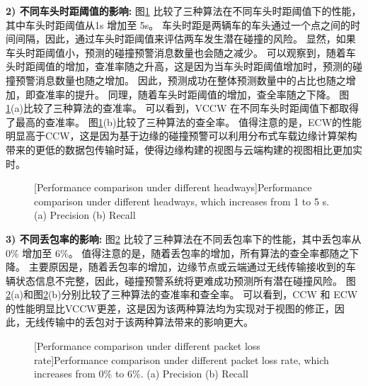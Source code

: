 \textbf{2) 不同车头时距阈值的影响:}
图\ref{fig 6-6} 比较了三种算法在不同车头时距阈值下的性能，其中车头时距阈值从1s 增加至 5s。
车头时距是两辆车的车头通过一个点之间的时间间隔，因此，通过车头时距阈值来评估两车发生潜在碰撞的风险。
显然，如果车头时距阈值小，预测的碰撞预警消息数量也会随之减少。
可以观察到，随着车头时距阈值的增加，查准率随之升高，这是因为当车头时距阈值增加时，预测的碰撞预警消息数量也随之增加。
因此，预测成功在整体预测数量中的占比也随之增加，即查准率的提升。
同理，随着车头时距阈值的增加，查全率随之下降。
图\ref{fig 6-6}(a)比较了三种算法的查准率。
可以看到，VCCW 在不同车头时距阈值下都取得了最高的查准率。
图\ref{fig 6-6}(b)比较了三种算法的查全率。
值得注意的是，ECW的性能明显高于CCW，这是因为基于边缘的碰撞预警可以利用分布式车载边缘计算架构带来的更低的数据包传输时延，使得边缘构建的视图与云端构建的视图相比更加实时。

\begin{figure}[h]
     \centering
     [Performance comparison under different headways]{Performance comparison under different headways, which increases from 1 to 5 s. (a) Precision (b) Recall}
     \label{fig 6-6}
\end{figure}

\textbf{3) 不同丢包率的影响:}
图\ref{fig 6-7} 比较了三种算法在不同丢包率下的性能，其中丢包率从 0\% 增加至 6\%。
值得注意的是，随着丢包率的增加，所有算法的查全率都随之下降。
主要原因是，随着丢包率的增加，边缘节点或云端通过无线传输接收到的车辆状态信息不完整，因此，碰撞预警系统将更难成功预测所有潜在碰撞风险。
图\ref{fig 6-7}(a)和图\ref{fig 6-7}(b)分别比较了三种算法的查准率和查全率。
可以看到，CCW 和 ECW的性能明显比VCCW更差，这是因为该两种算法均为实现对于视图的修正，因此，无线传输中的丢包对于该两种算法带来的影响更大。

\begin{figure}[h]
     \centering
     [Performance comparison under different packet loss rate]{Performance comparison under different packet loss rate, which increases from 0\% to 6\%. (a) Precision (b) Recall}
     \label{fig 6-7}
\end{figure}

